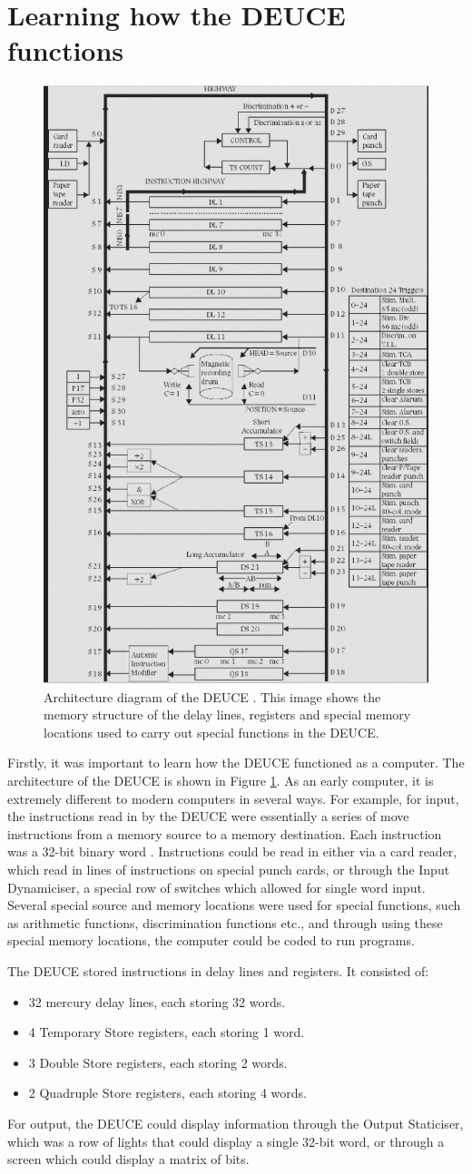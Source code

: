\documentclass{l4proj}
\begin{document}
\section{Learning how the DEUCE functions}
\begin{figure}[h!]
	\centering
	\includegraphics[width=0.5\linewidth]{images/deuce-arch.jpg} 
	\caption{Architecture diagram of the DEUCE \citep{Vowels05}. This image shows the memory structure of the delay lines, registers and special memory locations used to carry out special functions in the DEUCE.}
	\label{fig:arch}
\end{figure}

Firstly, it was important to learn how the DEUCE functioned as a computer. The architecture of the DEUCE is shown in Figure \ref{fig:arch}. As an early computer, it is extremely different to modern computers in several ways. For example, for input, the instructions read in by the DEUCE were essentially a series of move instructions from a memory source to a memory destination. Each instruction was a 32-bit binary word \citep{Weth10}. Instructions could be read in either via a card reader, which read in lines of instructions on special punch cards, or through the Input Dynamiciser, a special row of switches which allowed for single word input. Several special source and memory locations were used for special functions, such as arithmetic functions, discrimination functions etc., and through using these special memory locations, the computer could be coded to run programs.

The DEUCE stored instructions in delay lines and registers. It consisted of:
\begin{itemize}
	\item 32 mercury delay lines, each storing 32 words.
	\item 4 Temporary Store registers, each storing 1 word.
	\item 3 Double Store registers, each storing 2 words.
	\item 2 Quadruple Store registers, each storing 4 words.
\end{itemize}	
For output, the DEUCE could display information through the Output Staticiser, which was a row of lights that could display a single 32-bit word, or through a screen which could display a matrix of bits.
\end{document}
